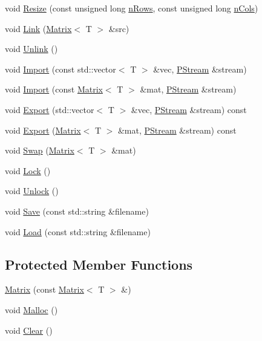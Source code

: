 \begin{DoxyCompactItemize}
\item 
void \hyperlink{classfractal_1_1Matrix_aca1a601a0a04affdf12f6b0d1454cc55}{Resize} (const unsigned long \hyperlink{classfractal_1_1Matrix_a1f328cc516cc0090940aaef4c1511616}{n\+Rows}, const unsigned long \hyperlink{classfractal_1_1Matrix_a6098a4de6b5fd299195916b99d7f3046}{n\+Cols})
\item 
void \hyperlink{classfractal_1_1Matrix_aab75a76f7b7f9c91b76ce4c9adc076ed}{Link} (\hyperlink{classfractal_1_1Matrix}{Matrix}$<$ T $>$ \&src)
\item 
void \hyperlink{classfractal_1_1Matrix_aff4e5e09948b75ee8677357708b8b266}{Unlink} ()
\item 
void \hyperlink{classfractal_1_1Matrix_afaa53ad5fa474a1c4fa662028a96afe9}{Import} (const std\+::vector$<$ T $>$ \&vec, \hyperlink{classfractal_1_1PStream}{P\+Stream} \&stream)
\item 
void \hyperlink{classfractal_1_1Matrix_a645a6f2f96e95698793124397c96457f}{Import} (const \hyperlink{classfractal_1_1Matrix}{Matrix}$<$ T $>$ \&mat, \hyperlink{classfractal_1_1PStream}{P\+Stream} \&stream)
\item 
void \hyperlink{classfractal_1_1Matrix_ad320af8c8e5c1e882d56cb5f935da75e}{Export} (std\+::vector$<$ T $>$ \&vec, \hyperlink{classfractal_1_1PStream}{P\+Stream} \&stream) const 
\item 
void \hyperlink{classfractal_1_1Matrix_affdcf02e6ca987dc753d931a26ed9738}{Export} (\hyperlink{classfractal_1_1Matrix}{Matrix}$<$ T $>$ \&mat, \hyperlink{classfractal_1_1PStream}{P\+Stream} \&stream) const 
\item 
void \hyperlink{classfractal_1_1Matrix_aefedaea457f317ae9c5b37fb464d123a}{Swap} (\hyperlink{classfractal_1_1Matrix}{Matrix}$<$ T $>$ \&mat)
\item 
void \hyperlink{classfractal_1_1Matrix_ad50c4aba6a3ea0496ffb863ad23e494f}{Lock} ()
\item 
void \hyperlink{classfractal_1_1Matrix_a701c094fe728e9f83aaafe109e9e921f}{Unlock} ()
\item 
void \hyperlink{classfractal_1_1Matrix_ab3c9ceb8d18394e440f897047890aa6c}{Save} (const std\+::string \&filename)
\item 
void \hyperlink{classfractal_1_1Matrix_a2a01c4bb1aeea5046cde3d1974225f2e}{Load} (const std\+::string \&filename)
\end{DoxyCompactItemize}
\subsection*{Protected Member Functions}
\begin{DoxyCompactItemize}
\item 
\hyperlink{classfractal_1_1Matrix_a5a21ac036432fabf45a8d7bc3ab80cb4}{Matrix} (const \hyperlink{classfractal_1_1Matrix}{Matrix}$<$ T $>$ \&)
\item 
void \hyperlink{classfractal_1_1Matrix_a853bffc92778e846bb9c9c841978a992}{Malloc} ()
\item 
void \hyperlink{classfractal_1_1Matrix_a236c6b554535460eead0282d58d62cc4}{Clear} ()
\end{DoxyCompactItemize}
